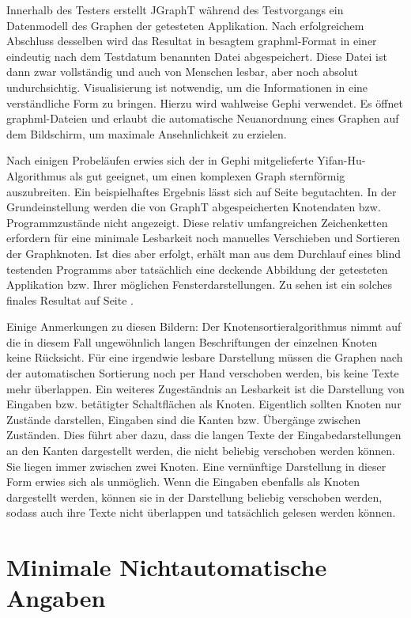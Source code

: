 Innerhalb des Testers erstellt JGraphT während des Testvorgangs 
ein Datenmodell des Graphen der getesteten Applikation. Nach erfolgreichem
Abschluss desselben wird das Resultat in besagtem graphml-Format
in einer eindeutig nach dem Testdatum benannten Datei abgespeichert.
Diese Datei ist dann zwar vollständig und auch von Menschen lesbar,
aber noch absolut undurchsichtig. Visualisierung ist notwendig,
um die Informationen in eine verständliche Form zu bringen.
Hierzu wird wahlweise Gephi verwendet. Es öffnet graphml-Dateien
und erlaubt die automatische Neuanordnung eines Graphen auf dem
Bildschirm, um maximale Ansehnlichkeit zu erzielen.

Nach einigen Probeläufen erwies sich der in Gephi mitgelieferte 
Yifan-Hu-Algorithmus \cite{hu2005efficient} als gut geeignet,
um einen komplexen Graph sternförmig auszubreiten. Ein beispielhaftes
Ergebnis lässt sich auf Seite \pageref{fig:model_firstspirit_notext}
begutachten. In der Grundeinstellung werden die von GraphT
abgespeicherten Knotendaten bzw. Programmzustände nicht angezeigt.
Diese relativ umfangreichen Zeichenketten erfordern für eine minimale
Lesbarkeit noch manuelles Verschieben und Sortieren der Graphknoten.
Ist dies aber erfolgt, erhält man aus dem Durchlauf eines blind testenden
Programms aber tatsächlich eine deckende Abbildung der getesteten
Applikation bzw. Ihrer möglichen Fensterdarstellungen. Zu sehen
ist ein solches finales Resultat auf Seite \pageref{fig:model_freespirit_06.10.2015}.

Einige Anmerkungen zu diesen Bildern: Der Knotensortieralgorithmus
nimmt auf die in diesem Fall ungewöhnlich langen Beschriftungen der einzelnen
Knoten keine Rücksicht. Für eine irgendwie lesbare Darstellung müssen die
Graphen nach der automatischen Sortierung noch per Hand verschoben werden,
bis keine Texte mehr überlappen. Ein weiteres Zugeständnis an Lesbarkeit
ist die Darstellung von Eingaben bzw. betätigter Schaltflächen als
Knoten. Eigentlich sollten Knoten nur Zustände darstellen, Eingaben
sind die Kanten bzw. Übergänge zwischen Zuständen. Dies führt aber dazu,
dass die langen Texte der Eingabedarstellungen an den Kanten dargestellt
werden, die nicht beliebig verschoben werden können. Sie liegen immer
zwischen zwei Knoten. Eine vernünftige Darstellung in dieser Form
erwies sich als unmöglich. Wenn die Eingaben ebenfalls als Knoten
dargestellt werden, können sie in der Darstellung beliebig verschoben
werden, sodass auch ihre Texte nicht überlappen und tatsächlich
gelesen werden können.


\section{Minimale Nichtautomatische Angaben}

